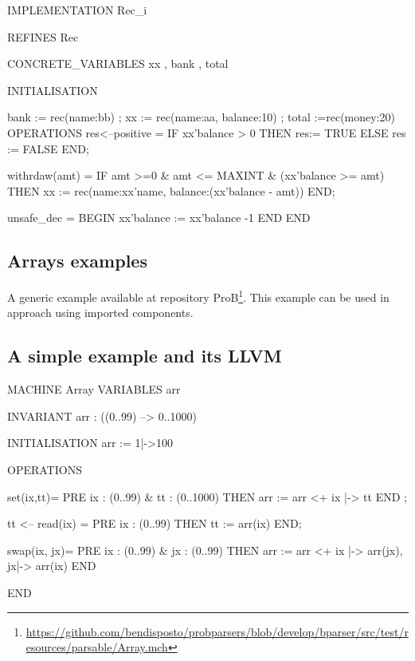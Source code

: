 \documentclass[10pt,a4paper]{article}
\begin{document}
\begin{ccode}
IMPLEMENTATION
    Rec_i

REFINES
    Rec

CONCRETE_VARIABLES
   xx ,
   bank ,
   total

INITIALISATION
   
   bank := rec(name:bb) ;
   xx := rec(name:aa, balance:10) ;
   total :=rec(money:20)
OPERATIONS
  res<--positive = 
  IF xx'balance > 0 THEN
       res:= TRUE 
  ELSE res := FALSE
  END;

  withrdaw(amt) = IF   amt >=0 & amt <= MAXINT & (xx'balance >= amt) THEN 
     xx := rec(name:xx'name, balance:(xx'balance - amt))
  END;

  unsafe_dec = BEGIN
       xx'balance := xx'balance -1 
  END
END
\end{ccode}




\subsection{Arrays examples}

A generic example available at repository ProB\footnote{
\url{https://github.com/bendisposto/probparsers/blob/develop/bparser/src/test/resources/parsable/Array.mch}}. 
This example can be used in approach using imported components.




\subsection{A  simple example and its LLVM}


\begin{ccode}
MACHINE
   Array
VARIABLES arr

INVARIANT 
    arr : ((0..99) --> 0..1000)

INITIALISATION arr := {1|->100}

OPERATIONS 

set(ix,tt)=
        PRE ix : (0..99) & tt : (0..1000)
        THEN arr := arr <+ {ix |-> tt}
        END ;

tt <-- read(ix) =
        PRE ix : (0..99)
        THEN tt := arr(ix)
        END;

swap(ix, jx)=
        PRE ix : (0..99) & jx : (0..99)
        THEN arr := arr <+ {ix |-> arr(jx), jx|-> arr(ix)}
        END

END
\end{ccode}
\end{document}
